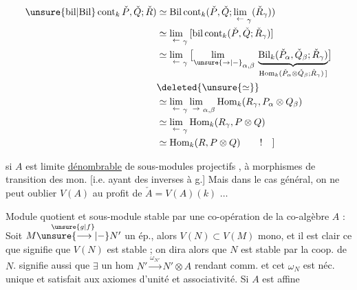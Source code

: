 \[
\begin{aligned}
\unsure{\mathrm{bil}|\mathrm{Bil}}\,\mathrm{cont}_{k}\,\check P,\check Q;\check R)
 &\simeq \mathrm{Bil}\,\mathrm{cont}_{k}(\check P,\check Q;\underset{\leftarrow}{\lim}_{\gamma}(\check R_{\gamma}))\\
 &\simeq \underset{\leftarrow}{\lim}_{\gamma}\,[\mathrm{bil}\,\mathrm{cont}_{k}(\check P,\check Q;\check R_{\gamma})]\\
 &\simeq \underset{\leftarrow}{\lim}_{\gamma}\,\bigl[\underset{\unsure{\rightarrow|-}}{\lim}_{\alpha,\beta}\,
 \underbrace{\mathrm{Bil}_{k}(\check P_{\alpha},\check Q_{\beta};\check R_{\gamma})}_{\mathrm{Hom}_{k}(\check P_{\alpha}\otimes\check Q_{\beta};\check R_{\gamma})\,]}\bigr]\\
 &\deleted{\unsure{\simeq}}\\
 &\simeq \underset{\leftarrow}{\lim}_{\gamma}\,\underset{\rightarrow}{\lim}_{\alpha,\beta}\,\mathrm{Hom}_{k}(R_{\gamma},P_{\alpha}\otimes Q_{\beta})\\
 &\simeq \underset{\leftarrow}{\lim}_{\gamma}\,\mathrm{Hom}_{k}(R_{\gamma},P\otimes Q)\\
 &\simeq \mathrm{Hom}_{k}(R,P\otimes Q)\qquad !\quad ]
\end{aligned}
\]

  si $A$ est limite  \uline{dénombrable} de sous-modules projectifs , à morphismes de transition  des  mon.  [i.e. ayant des inverses à g.] Mais dans le cas général, on ne peut oublier $V(A)$  au profit de $\check A=V(A)(k)$ $\ldots$

Module quotient et sous-module stable par une co-opération de la co-algèbre $A$ : Soit $M\overset{\unsure{g|f}}{\unsure{\longrightarrow|-}}N'$ un ép., alors $V(N)\subset V(M)$ mono, et il est clair ce que signifie que $V(N)$ est stable ; on dira alors que $N$ est stable par la coop. de $N$.  signifie aussi que $\exists$ un hom $N'\overset{\omega_{N'}}{\longrightarrow}N'\otimes A$ rendant comm.
et cet $\omega_{N}$ est néc. unique et satisfait aux axiomes d'unité et associativité. Si $A$ est  affine
